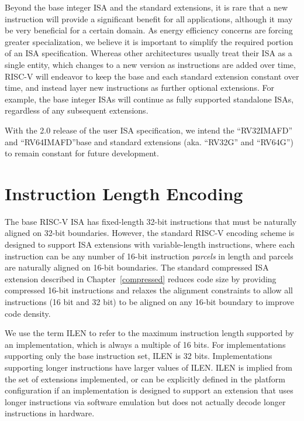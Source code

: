 Beyond the base integer ISA and the standard extensions, it is rare
that a new instruction will provide a significant benefit for all
applications, although it may be very beneficial for a certain domain.
As energy efficiency concerns are forcing greater specialization, we
believe it is important to simplify the required portion of an ISA
specification.  Whereas other architectures usually treat their ISA as
a single entity, which changes to a new version as instructions are
added over time, RISC-V will endeavor to keep the base and each
standard extension constant over time, and instead layer new
instructions as further optional extensions.  For example, the base
integer ISAs will continue as fully supported standalone ISAs,
regardless of any subsequent extensions.
\begin{commentary}
With the 2.0 release of the user ISA specification, we intend the
``RV32IMAFD'' and ``RV64IMAFD''base and standard extensions
(aka. ``RV32G'' and ``RV64G'') to remain constant for future
development.
\end{commentary}

\section{Instruction Length Encoding}

The base RISC-V ISA has fixed-length 32-bit instructions that must be
naturally aligned on 32-bit boundaries.  However, the standard RISC-V
encoding scheme is designed to support ISA extensions with
variable-length instructions, where each instruction can be any number
of 16-bit instruction {\em parcels} in length and parcels are
naturally aligned on 16-bit boundaries.  The standard compressed ISA
extension described in Chapter~\ref{compressed} reduces code size by
providing compressed 16-bit instructions and relaxes the alignment
constraints to allow all instructions (16 bit and 32 bit) to be
aligned on any 16-bit boundary to improve code density.

We use the term ILEN to refer to the maximum instruction length supported
by an implementation, which is always a multiple of 16 bits.  For
implementations supporting only the base instruction set, ILEN is 32 bits.
Implementations supporting longer instructions have larger values of ILEN.
ILEN is implied from the set of extensions implemented, or can be
explicitly defined in the platform configuration if an implementation is
designed to support an extension that uses longer instructions via software
emulation but does not actually decode longer instructions in hardware.

